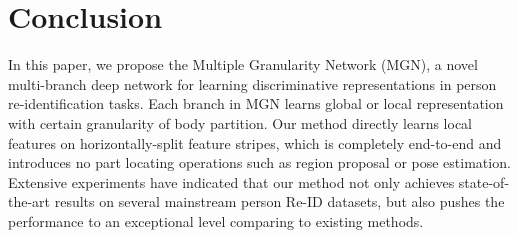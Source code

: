 \documentclass[sigconf]{acmart}
\begin{document}
\section{Conclusion}
In this paper, we propose the Multiple Granularity Network (MGN), a novel multi-branch deep network for learning discriminative representations in person re-identification tasks. Each branch in MGN learns global or local representation with certain granularity of body partition. Our method directly learns local features on horizontally-split feature stripes, which is completely end-to-end and introduces no part locating operations such as region proposal or pose estimation. Extensive experiments have indicated that our method not only achieves state-of-the-art results on several mainstream person Re-ID datasets, but also pushes the performance to an exceptional level comparing to existing methods.

 

\end{document}
